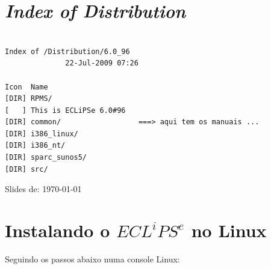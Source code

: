 \documentclass[final,a4paper]{article}
\begin{document}
\section{{\em Index of Distribution}}

\begin{verbatim}

Index of /Distribution/6.0_96
              22-Jul-2009 07:26    
              
Icon  Name                   
[DIR] RPMS/                   
[   ] This is ECLiPSe 6.0#96  
[DIR] common/                  ===> aqui tem os manuais ...
[DIR] i386_linux/             
[DIR] i386_nt/                
[DIR] sparc_sunos5/           
[DIR] src/                    
\end{verbatim}
Slides de: \today


\section{Instalando o $ECL^iPS^e$ no Linux}

Seguindo os passos abaixo numa console Linux:
\end{document}
